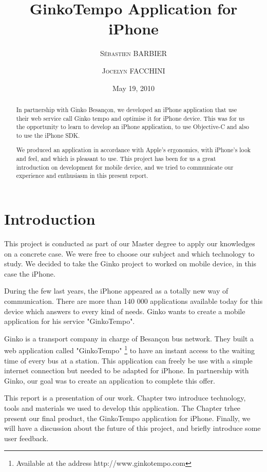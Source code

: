 \documentclass[a4paper, 12pt]{report}
\title{GinkoTempo Application for iPhone}
\date{May 19, 2010}
\author{\textsc{S\'{e}bastien BARBIER} \and \textsc{Jocelyn FACCHINI}}
\begin{document}
	
\maketitle


\begin{abstract} 

In partnership with Ginko Besan\c{c}on, we developed an iPhone application that use their web service call Ginko tempo and optimise it for iPhone device. This was for us the opportunity to learn to develop an iPhone application, to use Objective-C and also to use the iPhone SDK.

We produced an application in accordance with Apple's ergonomics, with iPhone's look and feel, and which is pleasant to use. This project has been for us a great introduction on development for mobile device, and we tried to communicate our experience and enthusiasm in this present report.

\end{abstract}

\tableofcontents

\chapter{Introduction}

This project is conducted as part of our Master degree to apply our knowledges on a concrete case. We were free to choose our subject and which technology to study. We decided to take the Ginko project to worked on mobile device, in this case the iPhone.

During the few last years, the iPhone appeared as a totally new way of communication. There are more than 140 000 applications available today for this device which answers to every kind of needs. Ginko wants to create a mobile application for his service "GinkoTempo".

Ginko is a transport company in charge of Besan\c{c}on bus network. They built a web application called "GinkoTempo" \footnote{Available at the address http://www.ginkotempo.com } to have an instant access to the waiting time of every bus at a station. This application can freely be use with a simple internet connection but needed to be adapted for iPhone. In partnership with Ginko, our goal was to create an application to complete this offer.

This report is a presentation of our work. Chapter two introduce technology, tools and materials we used to develop this application. The Chapter trhee present our final product, the GinkoTempo application for iPhone. Finally, we will have a discussion about the future of this project, and briefly introduce some user feedback.
\end{document}
